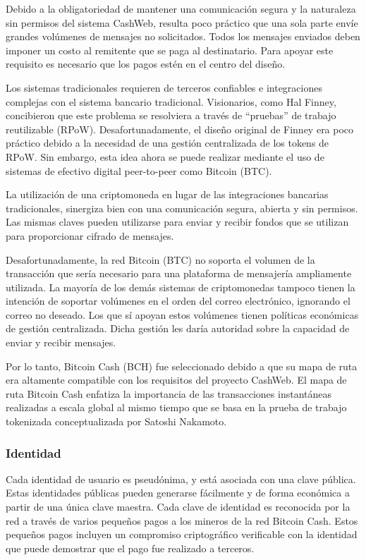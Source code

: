 \documentclass{article}
\begin{document}

Debido a la obligatoriedad de mantener una comunicación segura y la naturaleza sin permisos del sistema CashWeb, resulta poco práctico que una sola parte envíe grandes volúmenes de mensajes no solicitados. Todos los mensajes enviados deben imponer un costo al remitente que se paga al destinatario. Para apoyar este requisito es necesario que los pagos estén en el centro del diseño.

Los sistemas tradicionales requieren de terceros confiables e integraciones complejas con el sistema bancario tradicional. Visionarios, como Hal Finney, concibieron que este problema se resolviera a través de ``pruebas'' de trabajo reutilizable (RPoW). Desafortunadamente, el diseño original de Finney era poco práctico debido a la necesidad de una gestión centralizada de los tokens de RPoW. Sin embargo, esta idea ahora se puede realizar mediante el uso de sistemas de efectivo digital peer-to-peer como Bitcoin (BTC).

La utilización de una criptomoneda en lugar de las integraciones bancarias tradicionales, sinergiza bien con una comunicación segura, abierta y sin permisos. Las mismas claves pueden utilizarse para enviar y recibir fondos que se utilizan para proporcionar cifrado de mensajes.

Desafortunadamente, la red Bitcoin (BTC) no soporta el volumen de la transacción que sería necesario para una plataforma de mensajería ampliamente utilizada. La mayoría de los demás sistemas de criptomonedas tampoco tienen la intención de soportar volúmenes en el orden del correo electrónico, ignorando el correo no deseado. Los que sí apoyan estos volúmenes tienen políticas económicas de gestión centralizada. Dicha gestión les daría autoridad sobre la capacidad de enviar y recibir mensajes.

Por lo tanto, Bitcoin Cash (BCH) fue seleccionado debido a que su mapa de ruta era altamente compatible con los requisitos del proyecto CashWeb. El mapa de ruta Bitcoin Cash enfatiza la importancia de las transacciones instantáneas realizadas a escala global al mismo tiempo que se basa en la prueba de trabajo tokenizada conceptualizada por Satoshi Nakamoto.

\subsubsection{Identidad}

Cada identidad de usuario es pseudónima, y está asociada con una clave pública. Estas identidades públicas pueden generarse fácilmente y de forma económica a partir de una única clave maestra. Cada clave de identidad es reconocida por la red a través de varios pequeños pagos a los mineros de la red Bitcoin Cash. Estos pequeños pagos incluyen un compromiso criptográfico verificable con la identidad que puede demostrar que el pago fue realizado a terceros.
\end{document}
